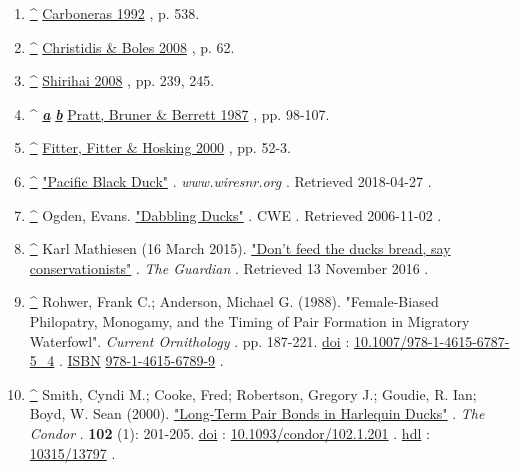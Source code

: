 \documentclass[11pt,a4paper]{article}
\begin{document}
\begin{enumerate}
\item \href{\#cite\_ref-FOOTNOTECarboneras1992538\_18-0}{\textbf{\textasciicircum{}}} \href{\#CITEREFCarboneras1992}{Carboneras 1992} , p. 538.
\item \href{\#cite\_ref-FOOTNOTEChristidisBoles200862\_19-0}{\textbf{\textasciicircum{}}} \href{\#CITEREFChristidisBoles2008}{Christidis \& Boles 2008} , p. 62.
\item \href{\#cite\_ref-FOOTNOTEShirihai2008239,\_245\_20-0}{\textbf{\textasciicircum{}}} \href{\#CITEREFShirihai2008}{Shirihai 2008} , pp. 239, 245.
\item \textasciicircum{} \href{\#cite\_ref-FOOTNOTEPrattBrunerBerrett198798–107\_21-0}{\textit{\textbf{a}}} \href{\#cite\_ref-FOOTNOTEPrattBrunerBerrett198798–107\_21-1}{\textit{\textbf{b}}} \href{\#CITEREFPrattBrunerBerrett1987}{Pratt, Bruner \& Berrett 1987} , pp. 98-107.
\item \href{\#cite\_ref-FOOTNOTEFitterFitterHosking200052–3\_22-0}{\textbf{\textasciicircum{}}} \href{\#CITEREFFitterFitterHosking2000}{Fitter, Fitter \& Hosking 2000} , pp. 52-3.
\item \href{\#cite\_ref-23}{\textbf{\textasciicircum{}}} \href{http://www.wiresnr.org/pacificblackduck.html}{"Pacific Black Duck"} . \textit{www.wiresnr.org} . Retrieved 2018-04-27 .
\item \href{\#cite\_ref-24}{\textbf{\textasciicircum{}}} Ogden, Evans. \href{https://www.sfu.ca/biology/wildberg/species/dabbducks.html}{"Dabbling Ducks"} . CWE . Retrieved 2006-11-02 .
\item \href{\#cite\_ref-25}{\textbf{\textasciicircum{}}} Karl Mathiesen (16 March 2015). \href{https://www.theguardian.com/environment/2015/mar/16/dont-feed-the-ducks-bread-say-conservationists}{"Don't feed the ducks bread, say conservationists"} . \textit{The Guardian} . Retrieved 13 November 2016 .
\item \href{\#cite\_ref-26}{\textbf{\textasciicircum{}}} Rohwer, Frank C.; Anderson, Michael G. (1988). "Female-Biased Philopatry, Monogamy, and the Timing of Pair Formation in Migratory Waterfowl". \textit{Current Ornithology} . pp. 187-221. \href{/wiki/Doi\_(identifier)}{doi} : \href{https://doi.org/10.1007\%2F978-1-4615-6787-5\_4}{10.1007/978-1-4615-6787-5\_4} . \href{/wiki/ISBN\_(identifier)}{ISBN} \href{/wiki/Special:BookSources/978-1-4615-6789-9}{978-1-4615-6789-9} .
\item \href{\#cite\_ref-27}{\textbf{\textasciicircum{}}} Smith, Cyndi M.; Cooke, Fred; Robertson, Gregory J.; Goudie, R. Ian; Boyd, W. Sean (2000). \href{https://doi.org/10.1093\%2Fcondor\%2F102.1.201}{"Long-Term Pair Bonds in Harlequin Ducks"} . \textit{The Condor} . \textbf{102} (1): 201-205. \href{/wiki/Doi\_(identifier)}{doi} : \href{https://doi.org/10.1093\%2Fcondor\%2F102.1.201}{10.1093/condor/102.1.201} . \href{/wiki/Hdl\_(identifier)}{hdl} : \href{https://hdl.handle.net/10315\%2F13797}{10315/13797} .

\end{enumerate}
\end{document}

